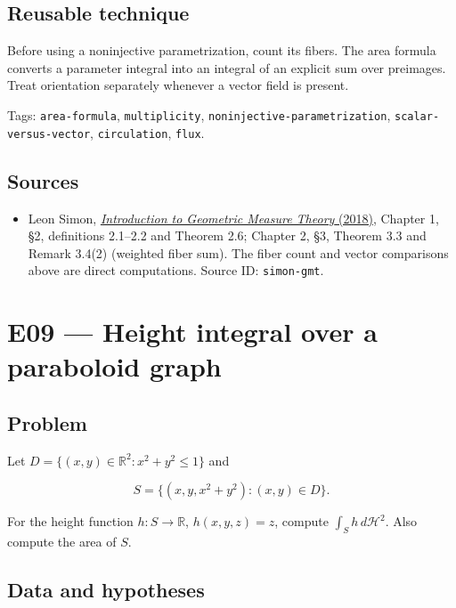 \documentclass[
  11pt,
]{article}
\providecommand{\tightlist}{%
  \setlength{\itemsep}{0pt}\setlength{\parskip}{0pt}}
\begin{document}
\subsection{Reusable technique}\label{reusable-technique-7}

Before using a noninjective parametrization, count its fibers. The area
formula converts a parameter integral into an integral of an explicit
sum over preimages. Treat orientation separately whenever a vector field
is present.

\begingroup\small\raggedright Tags: \texttt{area-\allowbreak{}formula}, \texttt{multiplicity},
\texttt{noninjective-\allowbreak{}parametrization}, \texttt{scalar-\allowbreak{}versus-\allowbreak{}vector},
\texttt{circulation}, \texttt{flux}.\par\endgroup

\subsection{Sources}\label{sources-7}

\begin{itemize}
\tightlist
\item
  Leon Simon,
  \href{https://math.stanford.edu/~lms/ntu-gmt-text.pdf}{\emph{Introduction
  to Geometric Measure Theory} (2018)}, Chapter 1, §2, definitions
  2.1--2.2 and Theorem 2.6; Chapter 2, §3, Theorem 3.3 and Remark 3.4(2)
  (weighted fiber sum). The fiber count and vector comparisons above are
  direct computations. Source ID: \texttt{simon-\allowbreak{}gmt}.
\end{itemize}

\section{E09 --- Height integral over a paraboloid graph}\label{E09}

\subsection{Problem}\label{problem-8}

Let \(D=\{(x,y)\in\mathbb R^2:x^2+y^2\leq1\}\) and

\[
S=\{(x,y,x^2+y^2):(x,y)\in D\}.
\]

For the height function \(h:S\to\mathbb R\), \(h(x,y,z)=z\), compute
\(\int_S h\,d\mathcal H^2\). Also compute the area of \(S\).

\subsection{Data and hypotheses}\label{data-and-hypotheses-8}
\end{document}
